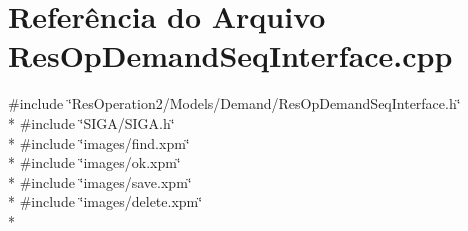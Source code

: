 \section{Referência do Arquivo Res\+Op\+Demand\+Seq\+Interface.\+cpp}
\label{_res_op_demand_seq_interface_8cpp}
{\ttfamily \#include \char`\"{}Res\+Operation2/\+Models/\+Demand/\+Res\+Op\+Demand\+Seq\+Interface.\+h\char`\"{}}\\*
{\ttfamily \#include \char`\"{}S\+I\+G\+A/\+S\+I\+G\+A.\+h\char`\"{}}\\*
{\ttfamily \#include \char`\"{}images/find.\+xpm\char`\"{}}\\*
{\ttfamily \#include \char`\"{}images/ok.\+xpm\char`\"{}}\\*
{\ttfamily \#include \char`\"{}images/save.\+xpm\char`\"{}}\\*
{\ttfamily \#include \char`\"{}images/delete.\+xpm\char`\"{}}\\*
